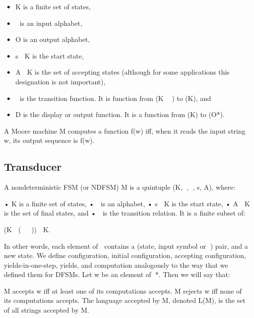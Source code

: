 \documentclass{article}
\begin{document}
\begin{itemize}
	\item K is a finite set of states,
	\item  is an input alphabet,
	\item O is an output alphabet,
	\item s  K is the start state,
	\item A  K is the set of accepting states (although for some applications this designation is not important),
	\item  is the transition function. It is function from (K  ) to (K), and
	\item D is the display or output function. It is a function from (K) to (O*).
\end{itemize}

A Moore machine M computes a function f(w) iff, when it reads the input string w, its output sequence is f(w).

\subsection{Transducer}

A nondeterministic FSM (or NDFSM) M is a quintuple (K, , , s, A), where:

• K is a finite set of states,
•  is an alphabet,
• s  K is the start state,
• A  K is the set of final states, and
•  is the transition relation. It is a finite subset of:

(K  (  {}))  K.

In other words, each element of  contains a (state, input symbol or ) pair,
and a new state. We define configuration, initial configuration, accepting
configuration, yields-in-one-step, yields, and computation analogously to the
way that we defined them for DFSMs. Let w be an element of *. Then we will say
that:

M accepts w iff at least one of its computations accepts. M rejects w iff none
of its computations accepts. The language accepted by M, denoted L(M), is the
set of all strings accepted by M.
\end{document}
